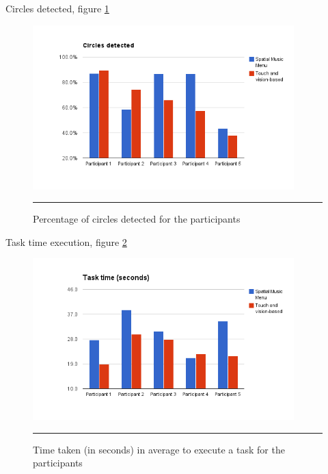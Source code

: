 

Circles detected, figure \ref{fig:resultscircles}

\begin{figure}[t]
	\centering
		\includegraphics[width=0.9\textwidth,height=\textheight,keepaspectratio]{./Figures/results_circles.png}
		\rule{35em}{1pt}
	\caption[Results circle detections]{Percentage of circles detected for the participants}
	\label{fig:resultscircles}
\end{figure}


Task time execution, figure \ref{fig:resultstasktime}

\begin{figure}[t]
	\centering
		\includegraphics[width=0.9\textwidth,height=\textheight,keepaspectratio]{./Figures/results_task_time.png}
		\rule{35em}{1pt}
	\caption[Results task time]{Time taken (in seconds) in average to execute a task for the participants}
	\label{fig:resultstasktime}
\end{figure}

